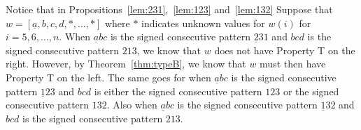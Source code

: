 \begin{remark}
Notice that in Propositions~\ref{lem:231},~\ref{lem:123} and~\ref{lem:132} Suppose that $w=[\underline{a},b,c,d, \ast, \ldots, \ast]$ where $\ast$ indicates unknown values for $w(i)$ for $i=5,6, \ldots, n$. When $\underline{a}bc$ is the signed consecutive pattern $\underline{2}31$ and $bcd$ is the signed consecutive pattern $213$, we know that $w$ does not have Property T on the right. However, by Theorem~\ref{thm:typeB}, we know that $w$ must then have Property T on the left. The same goes for when $\underline{a}bc$ is the signed consecutive pattern $\underline{1}23$ and $bcd$ is either the signed consecutive pattern $123$ or the signed consecutive pattern $132$. Also when $\underline{a}bc$ is the signed consecutive pattern $\underline{1}32$ and $bcd$ is the signed consecutive pattern $213$.	
\end{remark}





